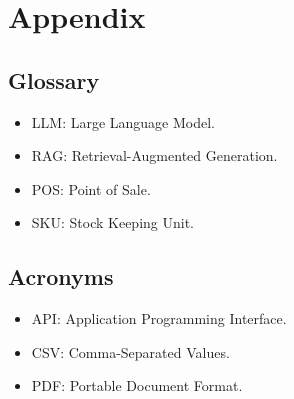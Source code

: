 \section{Appendix}
\subsection{Glossary}
\begin{itemize}
    \item LLM: Large Language Model.
    \item RAG: Retrieval-Augmented Generation.
    \item POS: Point of Sale.
    \item SKU: Stock Keeping Unit.
\end{itemize}

\subsection{Acronyms}
\begin{itemize}
    \item API: Application Programming Interface.
    \item CSV: Comma-Separated Values.
    \item PDF: Portable Document Format.
\end{itemize}
